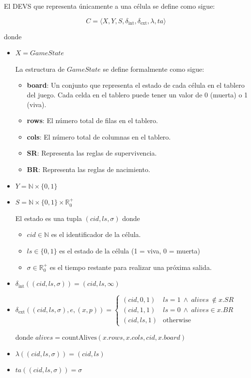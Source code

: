 \documentclass[]{article}
\newcommand{\dint}{\delta_{\text{int}}}
\newcommand{\dext}{\delta_{\text{ext}}}
\newcommand{\estado}{(cid,ls,\sigma)}
\newcommand{\R}{\mathbb{R}}
\newcommand{\N}{\mathbb{N}}
\begin{document}
El DEVS que representa únicamente a una célula se define como sigue:

\[ C = \langle X, Y, S, \dint, \dext, \lambda, ta \rangle \]

donde

\begin{itemize}
  \item $X = GameState$


        La estructura de $GameState$ se define formalmente como sigue:

        \begin{itemize}
          \item \textbf{board}: Un conjunto que representa el estado de cada célula en el tablero del juego. Cada celda en el tablero puede tener un valor de 0 (muerta) o 1 (viva).
          \item \textbf{rows}: El número total de filas en el tablero.
          \item \textbf{cols}: El número total de columnas en el tablero.
          \item \textbf{SR}: Representa las reglas de supervivencia.
          \item \textbf{BR}: Representa las reglas de nacimiento.
        \end{itemize}



  \item $Y = \N \times \{0,1\}$

  \item $S = \N \times \{0, 1\} \times  \R_0^+$

        El estado es una tupla $(cid, ls, \sigma)$ donde

        \begin{itemize}
          \item $cid \in \N$ es el identificador de la célula.
          \item $ls \in \{0, 1\}$ es el estado de la célula (1 = viva, 0 = muerta)
          \item $\sigma \in \R_0^+$ es el tiempo restante para realizar una próxima salida.
        \end{itemize}

  \item $\dint(\estado) = (cid,ls,\infty)$

  \item $\dext(\estado, e, (x, p)) = \begin{cases}
            (cid,0,1)  & ls = 1 \ \land \ alives \ \not \in x.SR \\
            (cid,1,1)  & ls = 0 \ \land \ alives \in x.BR        \\
            (cid,ls,1) & \text{otherwise }
          \end{cases}$

        donde $alives = \text{countAlives}(x.rows,x.cols,cid,x.board)$
  \item $\lambda(\estado) = (cid,ls) $
  \item $ta(\estado) = \sigma$
\end{itemize}
\end{document}
